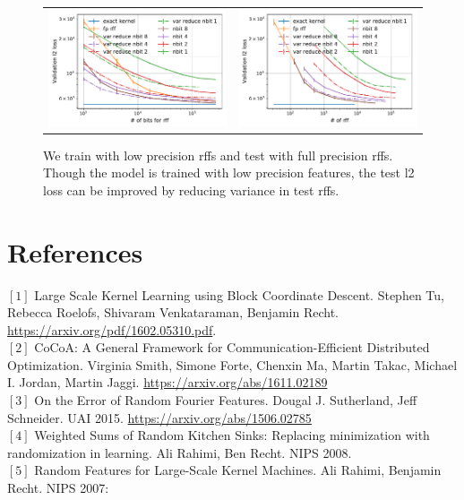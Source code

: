 \documentclass[12pt]{article}
\newcommand{\sq}{\sqrt{2}}
\newcommand{\teps}{\tilde{\epsilon}}
\newcommand{\tS}{\tilde{S}}
\begin{document}
\begin{figure}
	\centering
	\begin{tabular}{c c}
		\includegraphics[width=.5\linewidth]{figures/valid_l2_var_reduction.pdf} &
		\includegraphics[width=.5\linewidth]{figures/valid_l2_n_fp_var_reduction.pdf} \\
	\end{tabular}
	\caption{We train with low precision rffs and test with full precision rffs. Though the model is trained with low precision features, the test l2 loss can be improved by reducing variance in test rffs.}
	\label{fig:var_reduction}
\end{figure}
\section{References}
\noindent$[1]$ Large Scale Kernel Learning using Block Coordinate Descent.
Stephen Tu, Rebecca Roelofs, Shivaram Venkataraman, Benjamin Recht. \url{https://arxiv.org/pdf/1602.05310.pdf}. \\
$[2]$ CoCoA: A General Framework for Communication-Efficient Distributed Optimization.
Virginia Smith, Simone Forte, Chenxin Ma, Martin Takac, Michael I. Jordan, Martin Jaggi.  \url{https://arxiv.org/abs/1611.02189} \\
$[3]$ On the Error of Random Fourier Features. Dougal J. Sutherland, Jeff Schneider. UAI 2015. \url{https://arxiv.org/abs/1506.02785}\\
$[4]$ Weighted Sums of Random Kitchen Sinks: Replacing minimization with randomization in learning. Ali Rahimi, Ben Recht. NIPS 2008.\\
$[5]$	Random Features for Large-Scale Kernel Machines. Ali Rahimi, Benjamin Recht. NIPS 2007:
\end{document}
